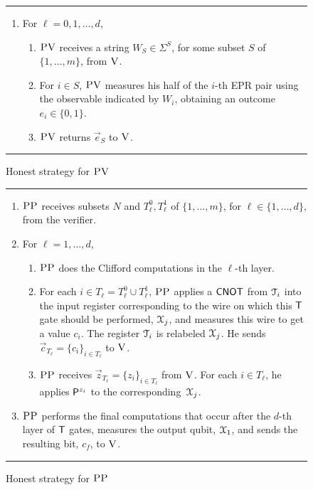   \begin{figure}[H]
\rule{\textwidth}{0.5pt}
\begin{enumerate}
\item For $\ell=0,1,\ldots,d$,
\begin{enumerate}
\item $\textsc{PV}$ receives a string $W_{S} \in\Sigma^{S}$, for some subset $S$ of $\{1,\ldots,m\}$, from $\textsc{V}$. 
\item For $i\in S$, $\textsc{PV}$ measures his half of the $i$-th EPR pair using the observable indicated by $W_i$, obtaining an outcome $e_i\in\{0,1\}$. 
\item $\textsc{PV}$ returns $\vec{e}_S$ to $\textsc{V}$. 
\end{enumerate}
\end{enumerate}
\rule[2ex]{\textwidth}{0.5pt}\vspace{-.5cm}
\caption{Honest strategy for $\textsc{PV}$}\label{fig:leash-protocol-PV}
  \end{figure}
  \begin{figure}
\rule[1ex]{\textwidth}{0.5pt}
\begin{enumerate}
\item $\textsc{PP}$ receives subsets $N$ and $T_\ell^0,T_\ell^1$ of $\{1,\ldots,m\}$, for $\ell\in\{1,\ldots,d\}$, from the verifier. 
\item For $\ell=1,\dots,d$, 
\begin{enumerate}
\item $\textsc{PP}$ does the Clifford computations in the $\ell$-th layer.
 \item For each $i\in T_\ell = T_\ell^0\cup T_\ell^1$, $\textsc{PP}$ applies a $\sf CNOT$ from ${\cal T}_i$ into the input register corresponding to the wire on which this $\sf T$ gate should be performed, ${\cal X}_{j}$, and measures this wire to get a value $c_i$. The register ${\cal T}_i$ is relabeled ${\cal X}_{j}$. He sends $\vec{c}_{T_\ell} = \{c_i\}_{i\in T_{\ell}}$ to $\textsc{V}$.
\item $\textsc{PP}$ receives $\vec{z}_{T_{\ell}}=\{z_i\}_{i\in T_\ell}$ from $\textsc{V}$. For each $i\in T_\ell$, he applies ${\sf P}^{z_i}$ to the corresponding~${\cal X}_{j}$. 
\end{enumerate} 
\item $\textsc{PP}$ performs the final computations that occur after the $d$-th layer of $\sf T$ gates, measures the output qubit, ${\cal X}_1$, and sends the resulting bit, $c_f$, to $\textsc{V}$. 
\end{enumerate}
\rule[2ex]{\textwidth}{0.5pt}\vspace{-.5cm}
\caption{Honest strategy for $\textsc{PP}$}\label{fig:leash-protocol-PP}
\end{figure}

